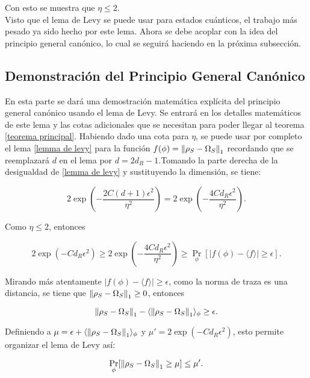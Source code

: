 Con esto se muestra que $\eta \le 2$.
\\
Visto que el lema de Levy se puede usar para estados cuánticos, el trabajo más pesado ya sido hecho por este lema. Ahora se debe acoplar con la idea del principio general canónico, lo cual se seguirá haciendo en la próxima subsección.

\subsection{Demonstración del Principio General Canónico}
En esta parte se dará una demostración matemática explícita del principio general canónico usando el lema de Levy. Se entrará en los detalles matemáticos de este lema y las cotas adicionales que se necesitan para poder llegar al teorema \ref{teorema principal}. Habiendo dado una cota para $\eta$, se puede usar por completo el lema \ref{lemma de levy} para la función $f(\phi)=\norm{\rho_{S} -\Omega_{S}}_{1}$ recordando que se reemplazará $d$ en el lema por $d=2d_{R}-1$.Tomando la parte derecha de la desigualdad de \ref{lemma de levy}  y sustituyendo la dimensión, se tiene:

\begin{equation}
 2 \exp(-\frac{2C(d+1)\epsilon^2}{\eta^2})= 2 \exp(-\frac{4Cd_{R}\epsilon^2}{\eta^2}).
\end{equation}

Como $\eta \le 2$, entonces

\begin{equation} \label{desigualdad}
2\exp(-Cd_{R}\epsilon^2) \ge 2 \exp(-\frac{4Cd_{R}\epsilon^2}{\eta^2}) \ge \Pr_{\phi}[|f(\phi)- \langle f \rangle| \ge \epsilon ].
\end{equation}

Mirando más atentamente  $|f(\phi)- \langle f \rangle| \ge \epsilon $, como la norma de traza es una distancia, se tiene que  $\norm{\rho_{S} -\Omega_{S}}_{1} \ge 0$, entonces


\begin{equation}
\norm{\rho_{S} -\Omega_{S}}_{1}- \langle \norm{\rho_{S} -\Omega_{S}}_{1} \rangle_{\phi} \ge \epsilon.
\end{equation}

Definiendo a $\mu = \epsilon + \langle \norm{\rho_{S} -\Omega_{S}}_{1} \rangle_{\phi} $ y $\mu'=2 \exp(-Cd_{R}\epsilon^2)$, esto permite organizar el lema de Levy así:

\begin{equation} \label{eq.3}
\Pr_{\phi}[\norm{\rho_{S} -\Omega_{S}}_{1} \ge \mu] \le \mu'.
\end{equation}

